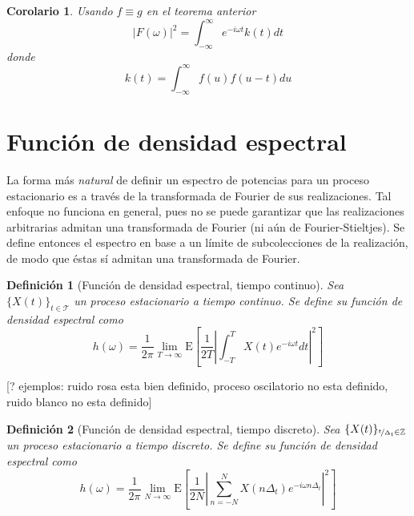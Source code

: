 \documentclass[12pt,letterpaper,draft]{book}
\newtheorem{definicion}{Definición}[chapter]
\newtheorem{corolario}[teorema]{Corolario}
\newcommand{\Z}{\mathbb{Z}}
\newcommand{\intR}{\int_{-\infty}^{\infty}}
\newcommand{\E}[1]{\mathrm{E}\left[ #1 \right]}
\newcommand{\abso}[1]{\left| #1 \right|}
\newcommand{\xt}{$\{X(t)\}_{t\in \mathcal{T}}$ }
\begin{document}
\begin{corolario}
Usando $f \equiv g$ en el teorema anterior
\begin{equation}
\abso{F(\omega)}^{2} = \intR e^{- i \omega t} k(t) dt 
\end{equation}
donde 
\begin{equation}
k(t) = \intR f(u) f(u-t) du
\end{equation}
\end{corolario}


\section{Función de densidad espectral}
\label{sec:fde}

La forma más \textit{natural} de definir un espectro de potencias para un proceso estacionario es a través de la transformada de Fourier de sus realizaciones. 
%
Tal enfoque no funciona en general, pues no se puede garantizar que las realizaciones arbitrarias admitan una transformada de Fourier (ni aún de Fourier-Stieltjes).
%
Se define entonces el espectro en base a un límite de subcolecciones de la realización, de modo que éstas sí admitan una transformada de Fourier.

\begin{definicion}[Función de densidad espectral, tiempo continuo]
Sea \xt un proceso estacionario a tiempo continuo. Se define su {función de densidad espectral} como
\begin{equation}
h(\omega) = \frac{1}{2 \pi} \lim_{T\rightarrow \infty} \E{ \frac{1}{2T} 
\abso{ \int_{-T}^{T} X(t) e^{-i \omega t} dt}^{2} }
\label{txt_FDE_cont}
\end{equation}
\end{definicion}

[? ejemplos: ruido rosa esta bien definido, proceso oscilatorio no esta definido, ruido blanco no esta definido]

\begin{definicion}[Función de densidad espectral, tiempo discreto]
Sea $\{X(t)\}_{\nicefrac{t}{\Delta_t}\in \Z}$ un proceso estacionario a tiempo discreto. Se define su {función de densidad espectral} como
\begin{equation}
h(\omega) = \frac{1}{2 \pi} \lim_{N\rightarrow \infty} \E{ \frac{1}{2N} 
\abso{ \sum_{n=-N}^{N} X(n \Delta_t) e^{-i \omega n \Delta_t}}^{2} }
\label{txt_FDE_disc}
\end{equation}
\end{definicion}
\end{document}
